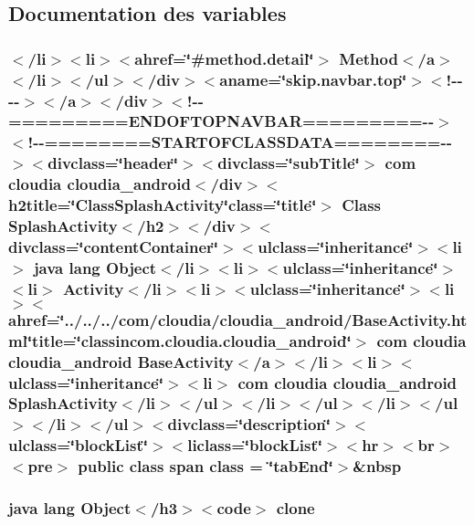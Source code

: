 \subsection{Documentation des variables}
\hypertarget{_splash_activity_8html_a2b7b0d247c6f220d6f1d5071108c7e4d}{
\subsubsection[{class}]{\setlength{\rightskip}{0pt plus 5cm}$<$/li$>$$<$li$>$$<$ahref=\char`\"{}\#method.\-detail\char`\"{}$>$ Method$<$/{\bf a}$>$$<$/li$>$$<$/ul$>$$<$/div$>$$<$aname=\char`\"{}skip.\-navbar.\-top\char`\"{}$>$$<$!-\/-\/-\/-\/$>$$<$/a$>$$<$/div$>$$<$!-\/-\/=========E\-N\-D\-O\-F\-T\-O\-P\-N\-A\-V\-B\-A\-R=========-\/-\/$>$$<$!-\/-\/========S\-T\-A\-R\-T\-O\-F\-C\-L\-A\-S\-S\-D\-A\-T\-A========-\/-\/$>$$<$divclass=\char`\"{}header\char`\"{}$>$$<$divclass=\char`\"{}sub\-Title\char`\"{}$>$ com cloudia cloudia\-\_\-android$<$/div$>$$<$h2title=\char`\"{}Class\-Splash\-Activity\char`\"{}class=\char`\"{}title\char`\"{}$>$ Class {\bf Splash\-Activity}$<$/h2$>$$<$/div$>$$<$divclass=\char`\"{}content\-Container\char`\"{}$>$$<$ulclass=\char`\"{}inheritance\char`\"{}$>$$<$li$>$ java lang Object$<$/li$>$$<$li$>$$<$ulclass=\char`\"{}inheritance\char`\"{}$>$$<$li$>$ Activity$<$/li$>$$<$li$>$$<$ulclass=\char`\"{}inheritance\char`\"{}$>$$<$li$>$$<$ahref=\char`\"{}../../../com/cloudia/cloudia\-\_\-android/Base\-Activity.\-html\char`\"{}title=\char`\"{}classincom.\-cloudia.\-cloudia\-\_\-android\char`\"{}$>$ com cloudia cloudia\-\_\-android {\bf Base\-Activity}$<$/{\bf a}$>$$<$/li$>$$<$li$>$$<$ulclass=\char`\"{}inheritance\char`\"{}$>$$<$li$>$ com cloudia cloudia\-\_\-android {\bf Splash\-Activity}$<$/li$>$$<$/ul$>$$<$/li$>$$<$/ul$>$$<$/li$>$$<$/ul$>$$<$/li$>$$<$/ul$>$$<$divclass=\char`\"{}description\char`\"{}$>$$<$ulclass=\char`\"{}block\-List\char`\"{}$>$$<$liclass=\char`\"{}block\-List\char`\"{}$>$$<$hr$>$$<$br$>$$<$pre$>$ public class {\bf span} class = \char`\"{}tab\-End\char`\"{}$>$\&nbsp}}\label{_splash_activity_8html_a2b7b0d247c6f220d6f1d5071108c7e4d}
\hypertarget{_splash_activity_8html_adc9607fcabf6f2d7f401ad52015ef6e0}{
\subsubsection[{clone}]{\setlength{\rightskip}{0pt plus 5cm}java lang Object$<$/h3$>$$<$code$>$ clone}}\label{_splash_activity_8html_adc9607fcabf6f2d7f401ad52015ef6e0}

